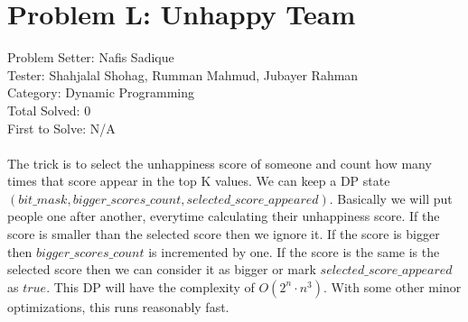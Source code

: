 \section*{Problem L: Unhappy Team}
Problem Setter: Nafis Sadique \\
Tester: Shahjalal Shohag, Rumman Mahmud, Jubayer Rahman \\
Category: Dynamic Programming \\
Total Solved:  0 \\
First to Solve: N/A \\
\\ 
The trick is to select the unhappiness score of someone and count how many times that score appear
in the top K values. We can keep a DP state $(bit\_mask, bigger\_scores\_count, selected\_score\_appeared)$.
Basically we will put people one after another, everytime calculating their unhappiness score. If the 
score is smaller than the selected score then we ignore it. If the score is bigger then $bigger\_scores\_count$
is incremented by one. If the score is the same is the selected score then we can consider it as bigger or 
mark $selected\_score\_appeared$ as $true$. This DP will have the complexity of $O(2^n\cdot n^3)$. With some
other minor optimizations, this runs reasonably fast.